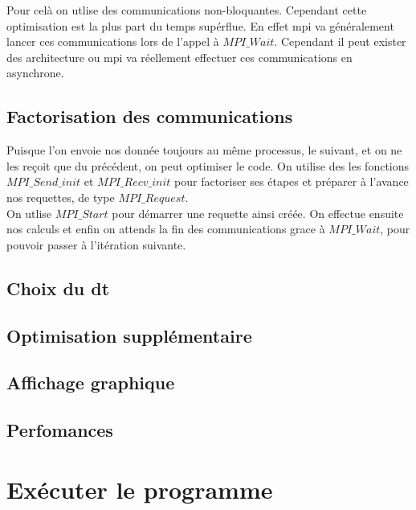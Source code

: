 \documentclass[paper=a4, fontsize=11pt]{scrartcl} %
\numberwithin{equation}{section} %
\numberwithin{figure}{section} %
\numberwithin{table}{section} %
\begin{document}
Pour celà on utlise des communications non-bloquantes. Cependant cette
optimisation est la plus part du temps supérflue. En effet mpi va
généralement lancer ces communications lors de l'appel à
$MPI\_Wait$. Cependant il peut exister des architecture ou mpi va
réellement effectuer ces communications en asynchrone.


\subsection{Factorisation des communications}
Puisque l'on envoie nos donnée toujours au même processus, le suivant,
et on ne les reçoit que du précédent, on peut optimiser le code. On
utilise des les fonctions $MPI\_Send\_init$ et $MPI\_Recv\_init$ pour
factoriser ses étapes et préparer à l'avance nos requettes, de type
$MPI\_Request$.\\ On utlise $MPI\_Start$ pour démarrer une requette
ainsi créée. On effectue ensuite nos calculs et enfin on attends la
fin des communications grace à $MPI\_Wait$, pour pouvoir passer à
l'itération suivante.


\subsection{Choix du dt}

\subsection{Optimisation supplémentaire}


\subsection{Affichage graphique}

\subsection{Perfomances}


\section{Exécuter le programme}
\end{document}
